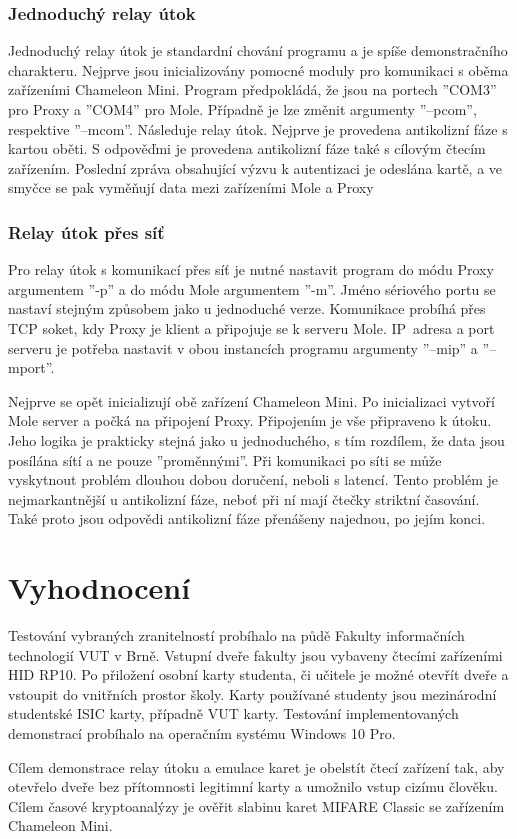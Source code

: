 \subsection*{Jednoduchý relay útok}
Jednoduchý relay útok je standardní chování programu a je spíše demonstračního charakteru. Nejprve jsou inicializovány pomocné moduly pro komunikaci s oběma zařízeními Chameleon Mini. Program předpokládá, že jsou na portech ''COM3'' pro Proxy a ''COM4'' pro Mole. Případně je lze změnit argumenty ''--pcom'', respektive ''--mcom''. Následuje relay útok. Nejprve je provedena antikolizní fáze s kartou oběti. S odpověďmi je provedena antikolizní fáze také s cílovým čtecím zařízením. Poslední zpráva obsahující výzvu k autentizaci je odeslána kartě, a ve smyčce se pak vyměňují data mezi zařízeními Mole a Proxy

\subsection*{Relay útok přes síť}
Pro relay útok s komunikací přes síť je nutné nastavit program do módu Proxy argumentem ''-p'' a do módu Mole argumentem ''-m''. Jméno sériového portu se nastaví stejným způsobem jako u jednoduché verze. Komunikace probíhá přes TCP soket, kdy Proxy je klient a připojuje se k serveru Mole. IP~adresa a port serveru je potřeba nastavit v obou instancích programu argumenty ''--mip'' a ''--mport''. \par
Nejprve se opět inicializují obě zařízení Chameleon Mini. Po inicializaci vytvoří Mole server a počká na připojení Proxy. Připojením je vše připraveno k útoku. Jeho logika je prakticky stejná jako u jednoduchého, s tím rozdílem, že data jsou posílána sítí a ne pouze ''proměnnými''. Při komunikaci po síti se může vyskytnout problém dlouhou dobou doručení, neboli s latencí. Tento problém je nejmarkantnější u antikolizní fáze, neboť při ní mají čtečky striktní časování. Také proto jsou odpovědi antikolizní fáze přenášeny najednou, po jejím konci.


    \chapter{Vyhodnocení}
Testování vybraných zranitelností probíhalo na půdě Fakulty informačních technologií VUT v Brně. Vstupní dveře fakulty jsou vybaveny čtecími zařízeními HID RP10\footnotemark. Po přiložení osobní karty studenta, či učitele je možné otevřít dveře a vstoupit do vnitřních prostor školy. Karty používané studenty jsou mezinárodní studentské ISIC karty, případně VUT karty. Testování implementovaných demonstrací probíhalo na operačním systému Windows 10 Pro.\par
Cílem demonstrace relay útoku a emulace karet je obelstít čtecí zařízení tak, aby otevřelo dveře bez přítomnosti legitimní karty a umožnilo vstup cizímu člověku. Cílem časové kryptoanalýzy je ověřit slabinu karet MIFARE Classic se zařízením Chameleon Mini.

